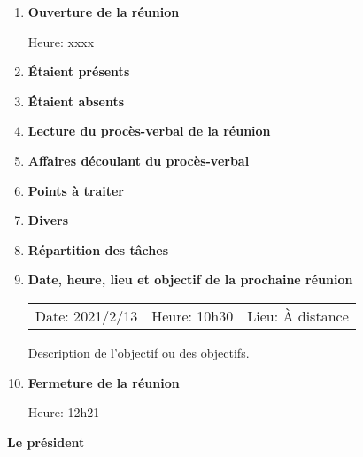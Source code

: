 \documentclass[12pt]{ULojpv}
\begin{document}
\entete
\begin{enumerate}

\item \textbf{Ouverture de la réunion}

Heure: xxxx

\item \textbf{Étaient présents}


\item \textbf{Étaient absents}




\item \textbf{Lecture du procès-verbal de la réunion }


\item \textbf{Affaires découlant du procès-verbal}


\item \textbf{Points à traiter}


\item \textbf{Divers}

\item \textbf{Répartition des tâches}



\item \textbf{Date, heure, lieu et objectif de la prochaine réunion}

\begin{tabular}{@{}lll}
   Date: 2021/2/13
   & Heure: 10h30
   &  Lieu: À distance
\end{tabular}
\par
Description de l'objectif ou des objectifs.


\item \textbf{Fermeture de la réunion}

Heure: 12h21




\end{enumerate}

\begin{flushright}
   \textbf{Le président}

\end{flushright}
\end{document}
